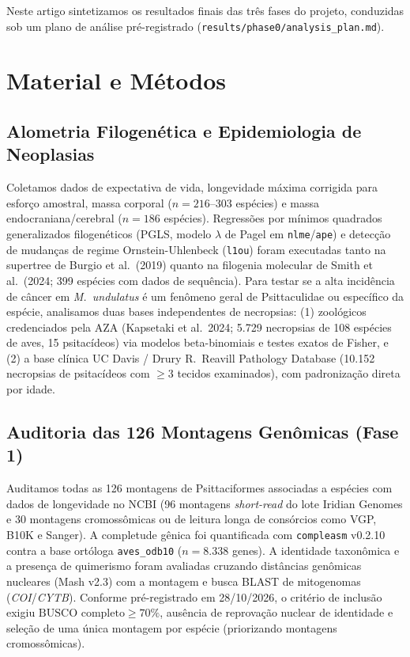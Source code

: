 \documentclass[10pt,a4paper,twocolumn]{article}
\begin{document}
Neste artigo sintetizamos os resultados finais das três fases do projeto, conduzidas sob um plano de análise pré-registrado (\texttt{results/phase0/analysis\_plan.md}).

\section{Material e Métodos}

\subsection{Alometria Filogenética e Epidemiologia de Neoplasias}
Coletamos dados de expectativa de vida, longevidade máxima corrigida para esforço amostral, massa corporal ($n = 216$--$303$ espécies) e massa endocraniana/cerebral ($n = 186$ espécies). Regressões por mínimos quadrados generalizados filogenéticos (PGLS, modelo $\lambda$ de Pagel em \texttt{nlme}/\texttt{ape}) e detecção de mudanças de regime Ornstein-Uhlenbeck (\texttt{l1ou}) foram executadas tanto na supertree de Burgio et al.\ (2019) quanto na filogenia molecular de Smith et al.\ (2024; 399 espécies com dados de sequência). Para testar se a alta incidência de câncer em \textit{M.\ undulatus} é um fenômeno geral de Psittaculidae ou específico da espécie, analisamos duas bases independentes de necropsias: (1) zoológicos credenciados pela AZA (Kapsetaki et al.\ 2024; 5.729 necropsias de 108 espécies de aves, 15 psitacídeos) via modelos beta-binomiais e testes exatos de Fisher, e (2) a base clínica UC Davis / Drury R.\ Reavill Pathology Database (10.152 necropsias de psitacídeos com $\ge 3$ tecidos examinados), com padronização direta por idade.

\subsection{Auditoria das 126 Montagens Genômicas (Fase 1)}
Auditamos todas as 126 montagens de Psittaciformes associadas a espécies com dados de longevidade no NCBI (96 montagens \textit{short-read} do lote Iridian Genomes e 30 montagens cromossômicas ou de leitura longa de consórcios como VGP, B10K e Sanger). A completude gênica foi quantificada com \texttt{compleasm} v0.2.10 contra a base ortóloga \texttt{aves\_odb10} ($n = 8.338$ genes). A identidade taxonômica e a presença de quimerismo foram avaliadas cruzando distâncias genômicas nucleares (Mash v2.3) com a montagem e busca BLAST de mitogenomas (\textit{COI}/\textit{CYTB}). Conforme pré-registrado em 28/10/2026, o critério de inclusão exigiu $\text{BUSCO completo} \ge 70\%$, ausência de reprovação nuclear de identidade e seleção de uma única montagem por espécie (priorizando montagens cromossômicas).
\end{document}
